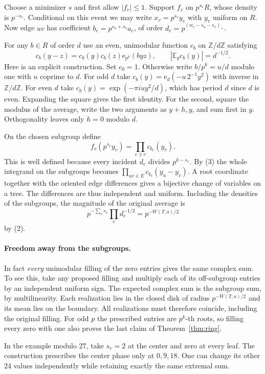 \documentclass[10pt]{article}
\newcommand{\E}{\mathbb E}
\newcommand{\Z}{\mathbb Z}
\newcommand{\ee}{\mathrm e}
\newcommand{\abs}[1]{\left|#1\right|}
\begin{document}
Choose a minimizer $s$ and first allow $|f_v|\le1$. Support $f_v$ on
$p^{s_v}R$, whose density is $p^{-s_v}$. Conditional on this event
we may write $x_v=p^{s_v}y_v$ with $y_v$ uniform on $R$. Now edge $uv$
has coefficient $b_e=p^{s_u+s_v}a_e$, of order
$d_e=p^{(w_e-s_u-s_v)_+}$.

For any $b\in R$ of order $d$ use an even, unimodular function $c_b$ on
$\Z/d\Z$ satisfying
\[
 c_b(y-z)=c_b(y)c_b(z)\ee_{p^k}(byz),\qquad
 \abs{\E_y c_b(y)}=d^{-1/2}. \tag{3}
\]
Here is an explicit construction. Set $c_0=1$. Otherwise write
$b/p^k=u/d$ modulo one with $u$ coprime to $d$. For odd $d$ take
$c_b(y)=\ee_d(-u\,2^{-1}y^2)$ with inverse in $\Z/d\Z$. For even $d$
take $c_b(y)=\exp(-\pi i u y^2/d)$, which has period $d$ since $d$ is
even. Expanding the square gives the first identity. For the second,
square the modulus of the average, write the two arguments as $y+h,y$,
and sum first in $y$. Orthogonality leaves only $h=0$ modulo $d$.

On the chosen subgroup define
\[
 f_v(p^{s_v}y_v)=\prod_{e\ni v}c_{b_e}(y_v).
\]
This is well defined because every incident $d_e$ divides $p^{k-s_v}$.
By (3) the whole integrand on the subgroups becomes
$\prod_{uv\in E}c_{b_e}(y_u-y_v)$. A root coordinate together with the
oriented edge differences gives a bijective change of variables on a
tree. The differences are thus independent and uniform. Including the
densities of the subgroups, the magnitude of the original average is
\[
 p^{-\sum_v s_v}\prod_e d_e^{-1/2}=p^{-W(T,a)/2}
\]
by (2).

\paragraph{Freedom away from the subgroups.}
In fact \emph{every} unimodular filling of the zero entries gives the
same complex sum. To see this, take any proposed filling and multiply
each of its off-subgroup entries by an independent uniform sign. The
expected complex sum is the subgroup sum, by multilinearity. Each
realization lies in the closed disk of radius $p^{-W(T,a)/2}$ and its
mean lies on the boundary. All realizations must therefore coincide,
including the original filling. For odd $p$ the prescribed entries
are $p^k$-th roots, so filling every zero with one also proves the last
claim of Theorem~\ref{thm:ring}.

In the example modulo $27$, take $s_v=2$ at the center and zero at every
leaf. The construction prescribes the center phase only at $0,9,18$.
One can change its other $24$ values independently while retaining
exactly the same extremal sum.
\end{document}
